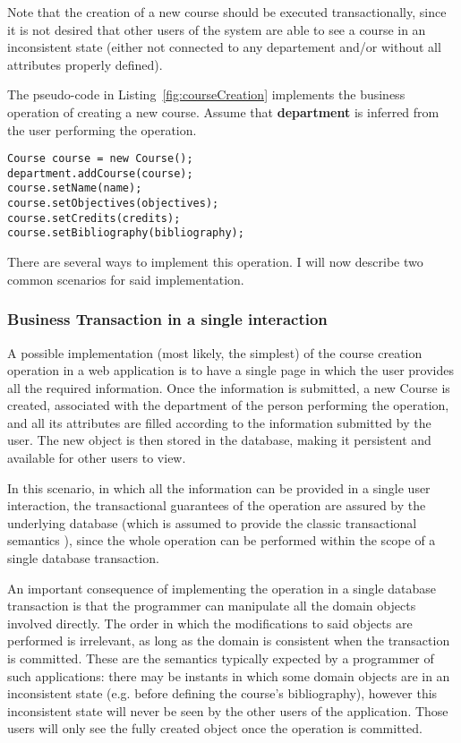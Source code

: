 \documentclass{llncs}
\begin{document}
Note that the creation of a new course should be executed
transactionally, since it is not desired that other users of the
system are able to see a course in an inconsistent state (either not
connected to any departement and/or without all attributes properly
defined).

The pseudo-code in Listing~\ref{fig:courseCreation} implements the
business operation of creating a new course. Assume that {\bf
  department} is inferred from the user performing the operation.

\begin{lstlisting}
Course course = new Course();
department.addCourse(course);
course.setName(name);
course.setObjectives(objectives);
course.setCredits(credits);
course.setBibliography(bibliography);
\end{lstlisting}

There are several ways to implement this operation. I will now
describe two common scenarios for said implementation.

\subsubsection{Business Transaction in a single interaction}

A possible implementation (most likely, the simplest) of the course
creation operation in a web application is to have a single page in
which the user provides all the required information. Once the
information is submitted, a new Course is created, associated with the
department of the person performing the operation, and all its
attributes are filled according to the information submitted by the
user. The new object is then stored in the database, making it
persistent and available for other users to view.

In this scenario, in which all the information can be provided in a
single user interaction, the transactional guarantees of the operation
are assured by the underlying database (which is assumed to provide
the classic transactional semantics \cite{gray1981transaction}), since
the whole operation can be performed within the scope of a single
database transaction.

An important consequence of implementing the operation in a single
database transaction is that the programmer can manipulate all the
domain objects involved directly. The order in which the modifications
to said objects are performed is irrelevant, as long as the domain is
consistent when the transaction is committed. These are the semantics
typically expected by a programmer of such applications: there may be
instants in which some domain objects are in an inconsistent state
(e.g. before defining the course's bibliography), however this
inconsistent state will never be seen by the other users of the
application. Those users will only see the fully created object once
the operation is committed.
\end{document}
